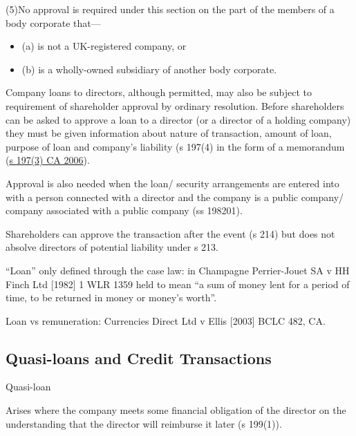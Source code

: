\documentclass[
]{article}
\providecommand{\tightlist}{%
  \setlength{\itemsep}{0pt}\setlength{\parskip}{0pt}}
\newenvironment{env-136e818f-6bd8-45c9-b7d8-e6b8925f9e62}
{
    \savenotes\tcolorbox[blanker,breakable,left=5pt,borderline west={2pt}{-4pt}{green}]
}
{
    \endtcolorbox\spewnotes
}
\newenvironment{env-246868e5-1b14-46c9-8aed-b83e61569202}
{
    \savenotes\tcolorbox[blanker,breakable,left=5pt,borderline west={2pt}{-4pt}{yellow}]
}
{
    \endtcolorbox\spewnotes
}
\begin{document}
\begin{env-136e818f-6bd8-45c9-b7d8-e6b8925f9e62}
(5)No approval is required under this section on the part of the members
of a body corporate that---

\begin{itemize}
\tightlist
\item
  (a) is not a UK-registered company, or
\item
  (b) is a wholly-owned subsidiary of another body corporate.
\end{itemize}

\end{env-136e818f-6bd8-45c9-b7d8-e6b8925f9e62}

Company loans to directors, although permitted, may also be subject to
requirement of shareholder approval by ordinary resolution. Before
shareholders can be asked to approve a loan to a director (or a director
of a holding company) they must be given information about nature of
transaction, amount of loan, purpose of loan and company's liability (s
197(4) in the form of a memorandum
(\href{https://www.legislation.gov.uk/ukpga/2006/46/section/197}{s
197(3) CA 2006}).

Approval is also needed when the loan/ security arrangements are entered
into with a person connected with a director and the company is a public
company/ company associated with a public company (ss 198201).

Shareholders can approve the transaction after the event (s 214) but
does not absolve directors of potential liability under s 213.

``Loan'' only defined through the case law: in Champagne Perrier-Jouet
SA v HH Finch Ltd {[}1982{]} 1 WLR 1359 held to mean ``a sum of money
lent for a period of time, to be returned in money or money's worth''.

Loan vs remuneration: Currencies Direct Ltd v Ellis {[}2003{]} BCLC 482,
CA.

\hypertarget{quasi-loans-and-credit-transactions}{%
\subsection{Quasi-loans and Credit
Transactions}\label{quasi-loans-and-credit-transactions}}

\begin{env-246868e5-1b14-46c9-8aed-b83e61569202}

Quasi-loan

Arises where the company meets some financial obligation of the director
on the understanding that the director will reimburse it later (s
199(1)).

\end{env-246868e5-1b14-46c9-8aed-b83e61569202}
\end{document}
